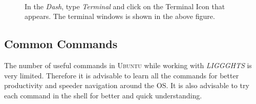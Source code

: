 \documentclass{tufte-book} %
\newcommand{\Li}{\textit{LIGGGHTS}\xspace}
\begin{document}
\begin{figure}[p]
\\\vspace{\baselineskip}
\caption{In the \emph{Dash}, type \emph{Terminal} and click on the Terminal Icon that appears. The terminal windows is shown in the above figure.}
\end{figure}





\subsection{Common Commands}

\begin{fullwidth}
  The number of useful commands in \textsc{Ubuntu} while working with \Li is very limited. Therefore it is advisable to learn all the commands for better productivity and speeder navigation around the OS. It is also advisable to try each command in the shell for better and quick understanding. 
\end{fullwidth}
\end{document}
